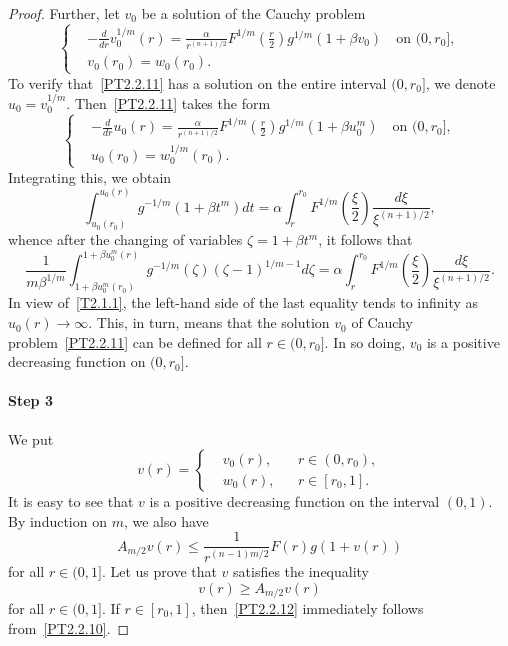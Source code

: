 \documentclass[10pt,a4paper]{amsart}
\begin{document}
\begin{proof}
Further, let $v_0$ be a solution of the Cauchy problem
\begin{equation}
	\left\{
		\begin{aligned}
			&
			- \frac{
				d
			}{
				d r
			}
			v_0^{1 / m} (r)
			=
			\frac{
				\alpha
			}{
				r^{(n + 1) / 2}
			}
			F^{1 / m} 
			\left(
				\frac{r}{2}
			\right)
			g^{1 / m} (1 + \beta v_0)
			\quad
			\mbox{on } (0, r_0],
			\\
			&
			v_0 (r_0) = w_0 (r_0).
		\end{aligned}
	\right.
	\label{PT2.2.11}
\end{equation}
To verify that~\eqref{PT2.2.11} has a solution on the entire interval $(0, r_0]$, we denote $u_0 = v_0^{1 / m}$. Then~\eqref{PT2.2.11} takes the form
$$
	\left\{
		\begin{aligned}
			&
			- \frac{
			d
			}{
				d r
			}
			u_0 (r)
			=
			\frac{
				\alpha
			}{
				r^{(n + 1) / 2}
			}
			F^{1 / m}
			\left(
				\frac{r}{2}
			\right)
			g^{1 / m} (1 + \beta u_0^m)
			\quad
			\mbox{on } (0, r_0],
			\\
			&
			u_0 (r_0) = w_0^{1 / m} (r_0).
		\end{aligned}
	\right.
$$
Integrating this, we obtain
$$
	\int_{
		u_0 (r_0)
	}^{
		u_0 (r)
	}
	g^{- 1 / m} (1 + \beta t^m)
	d t
	=
	\alpha
	\int_r^{r_0}
	F^{1 / m}
	\left(
		\frac{\xi}{2}
	\right)
	\frac{
		d\xi
	}{
		\xi^{(n + 1) / 2}
	},
$$
whence after the changing of variables $\zeta = 1 + \beta t^m$, it follows that
$$
	\frac{
		1
	}{
		m \beta^{1 / m}
	}
	\int_{
		1 + \beta u_0^m (r_0)
	}^{
		1 + \beta u_0^m (r)
	}
	g^{- 1 / m} (\zeta)
	(\zeta - 1)^{1 / m - 1}
	d \zeta
	=
	\alpha
	\int_r^{r_0}
	F^{1 / m}
	\left(
		\frac{\xi}{2}
	\right)
	\frac{
		d\xi
	}{
		\xi^{(n + 1) / 2}
	}.
$$
In view of~\eqref{T2.1.1}, the left-hand side of the last equality tends to infinity as $u_0 (r) \to \infty$. This, in turn, means that the solution $v_0$ of Cauchy problem~\eqref{PT2.2.11} can be defined for all $r \in (0, r_0]$.
In so doing, $v_0$ is a positive decreasing function on $(0, r_0]$.

\paragraph{Step 3}
We put
$$
	v (r)
	=
	\left\{
		\begin{aligned}
			&
			v_0 (r),
			&&
			r \in (0, r_0),
			\\
			&
			w_0 (r),
			&&
			r \in [r_0, 1].
		\end{aligned}
	\right.
$$
It is easy to see that $v$ is a positive decreasing function on the interval $(0, 1)$. By induction on $m$, we also have
\begin{equation}
	A_{m/2} v (r)
	\le
	\frac{
		1
	}{
		r^{(n - 1) m / 2}
	}
	F (r) 
	g (1 + v (r))
	\label{PT2.2.13}
\end{equation}
for all $r \in (0, 1]$.
Let us prove that $v$ satisfies the inequality
\begin{equation}
	v (r)
	\ge
	A_{m/2} v (r)
	\label{PT2.2.12}
\end{equation}
for all $r \in (0, 1]$.
If $r \in [r_0, 1]$, then~\eqref{PT2.2.12} immediately follows from~\eqref{PT2.2.10}.


\end{proof}
\end{document}
